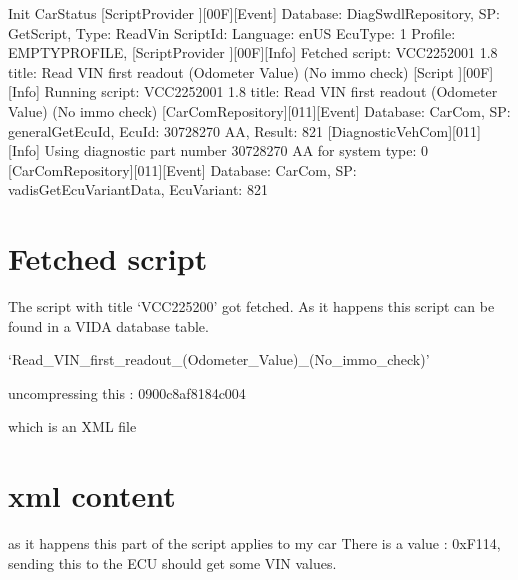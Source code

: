 \documentclass[letterpaper,10pt,english]{sphinxmanual}
\begin{document}
\begin{sphinxVerbatim}[commandchars=\\\{\}]
[CarStatus       ][00F][Info]    Init CarStatus
[ScriptProvider  ][00F][Event]   Database: DiagSwdlRepository, SP: GetScript,  Type: \PYGZsq{}ReadVin\PYGZsq{} ScriptId: \PYGZsq{}\PYGZsq{} Language: \PYGZsq{}en\PYGZhy{}US\PYGZsq{} EcuType: \PYGZsq{}\PYGZhy{}1\PYGZsq{} Profile: \PYGZsq{}EMPTYPROFILE,\PYGZsq{}
[ScriptProvider  ][00F][Info]    Fetched script: \PYGZsq{}VCC\PYGZhy{}225200\PYGZhy{}1 1.8\PYGZsq{} title: \PYGZsq{}Read VIN first readout (Odometer Value) (No immo check)\PYGZsq{}
[Script          ][00F][Info]    Running script: \PYGZsq{}VCC\PYGZhy{}225200\PYGZhy{}1 1.8\PYGZsq{} title: \PYGZsq{}Read VIN first readout (Odometer Value) (No immo check)\PYGZsq{}
[CarComRepository][011][Event]   Database: CarCom, SP: general\PYGZus{}GetEcuId, EcuId: 30728270 AA, Result: 821
[DiagnosticVehCom][011][Info]    Using diagnostic part number \PYGZsq{}30728270 AA\PYGZsq{} for system type: \PYGZsq{}0\PYGZsq{}
[CarComRepository][011][Event]   Database: CarCom, SP: vadis\PYGZus{}GetEcuVariantData, EcuVariant: 821
\end{sphinxVerbatim}


\section{Fetched script}
\label{\detokenize{vin:fetched-script}}
\sphinxAtStartPar
The script with title ‘VCC\sphinxhyphen{}225200’ got fetched.
As it happens this script can be found in a VIDA database table.

\sphinxAtStartPar
{}

\sphinxAtStartPar
‘Read\_VIN\_first\_readout\_(Odometer\_Value)\_(No\_immo\_check)’

\sphinxAtStartPar
uncompressing this : 0900c8af8184c004

\sphinxAtStartPar
which is an XML file


\section{xml content}
\label{\detokenize{vin:xml-content}}
\sphinxAtStartPar
as it happens this part of the script applies to my car
There is a value : 0xF114, sending this to the ECU should get some VIN values.
\end{document}
